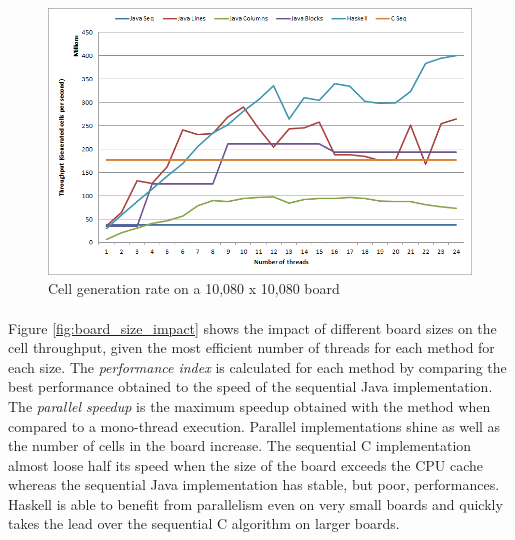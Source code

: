 \documentclass[a4paper]{article}
\begin{document}
    \begin{figure}[h]
        \centering
        \includegraphics[width=0.75\linewidth]{results/10080_throughput.png}
        \caption{
            Cell generation rate on a 10,080 x 10,080 board
            \label{fig:10080_throughput}
        }
    \end{figure}

    \paragraph{}Figure \ref{fig:board_size_impact} shows the impact of different
board sizes on the cell throughput, given the most efficient number of threads
for each method for each size. \newline
The \textit{performance index} is calculated for each method by comparing the
best performance obtained to the speed of the sequential Java implementation.
The \textit{parallel speedup} is the maximum speedup obtained with the method
when compared to a mono-thread execution.
Parallel implementations shine as well as the number of cells in the board
increase. The sequential C implementation almost loose half its speed when the
size of the board exceeds the CPU cache whereas the sequential Java
implementation has stable, but poor, performances. Haskell is able to benefit
from parallelism even on very small boards and quickly takes the lead over the 
sequential C algorithm on larger boards.
\end{document}
